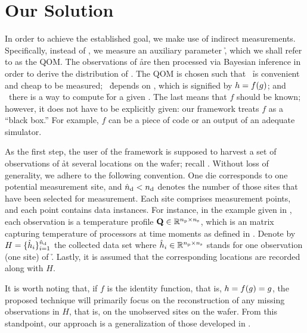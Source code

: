 \section{Our Solution}

In order to achieve the established goal, we make use of indirect measurements.
Specifically, instead of \g, we measure an auxiliary parameter \h, which we
shall refer to as the \ac{QOM}. The observations of \h are then processed via
Bayesian inference \cite{gelman2004} in order to derive the distribution of \g.
The \ac{QOM} is chosen such that \one~\h is convenient and cheap to be measured;
\two~\h depends on \g, which is signified by $h = f(g)$; and \three~there is a
way to compute \h for a given \g. The last means that $f$ should be known;
however, it does not have to be explicitly given: our framework treats $f$ as a
``black box.'' For example, $f$ can be a piece of code or an output of an
adequate simulator.

As the first step, the user of the framework is supposed to harvest a set of
observations of \h at several locations on the wafer; recall
. Without loss of generality, we adhere to the following
convention. One die corresponds to one potential measurement site, and ${\hat{n}_\mathrm{d}} <
{n_\mathrm{d}}$ denotes the number of those sites that have been selected for measurement.
Each site comprises \np measurement points, and each point contains \ns data
instances. For instance, in the example given in , each
observation is a temperature profile $\mathbf{Q} \in \mathbb{R}^{{n_\mathrm{p}} \times {n_\mathrm{s}}}$, which is
an matrix capturing temperature of \np processors at \ns time moments as defined
in . Denote by $H = \{ \hat{h}_i \}_{i = 1}^{{\hat{n}_\mathrm{d}}}$ the
collected data set where $\hat{h}_i \in \mathbb{R}^{{n_\mathrm{p}} \times {n_\mathrm{s}}}$ stands for one
observation (one site) of \h. Lastly, it is assumed that the corresponding
locations are recorded along with $H$.

It is worth noting that, if $f$ is the identity function, that is, $h = f(g) =
g$, the proposed technique will primarily focus on the reconstruction of any
missing observations in $H$, that is, on the unobserved sites on the wafer. From
this standpoint, our approach is a generalization of those developed in
\cite{zhang2010, reda2009}.

